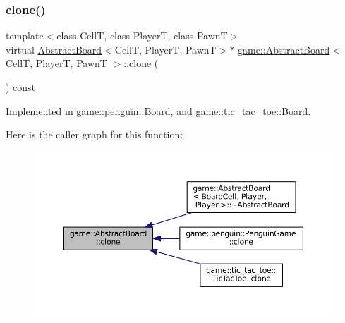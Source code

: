 \subsubsection{\texorpdfstring{clone()}{clone()}}
{\footnotesize\ttfamily template$<$class CellT, class PlayerT, class PawnT$>$ \\
virtual \hyperlink{classgame_1_1_abstract_board}{Abstract\+Board}$<$CellT, PlayerT, PawnT$>$$\ast$ \hyperlink{classgame_1_1_abstract_board}{game\+::\+Abstract\+Board}$<$ CellT, PlayerT, PawnT $>$\+::clone (\begin{DoxyParamCaption}{ }\end{DoxyParamCaption}) const\hspace{0.3cm}{\ttfamily [pure virtual]}}



Implemented in \hyperlink{classgame_1_1penguin_1_1_board_acad4a3c7bee2103aea4586356ceabb8e}{game\+::penguin\+::\+Board}, and \hyperlink{classgame_1_1tic__tac__toe_1_1_board_a9d7a2c225f06a3410b11b688d9d6bcf8}{game\+::tic\+\_\+tac\+\_\+toe\+::\+Board}.

Here is the caller graph for this function\+:
\nopagebreak
\begin{figure}[H]
\begin{center}
\leavevmode
\includegraphics[width=350pt]{classgame_1_1_abstract_board_abd467b64fd2c0dfbc0ce87200afb3e9e_icgraph}
\end{center}
\end{figure}
\mbox{\label{classgame_1_1_abstract_board_a8def8902ce65947b506ecb129cb7b918}} 
